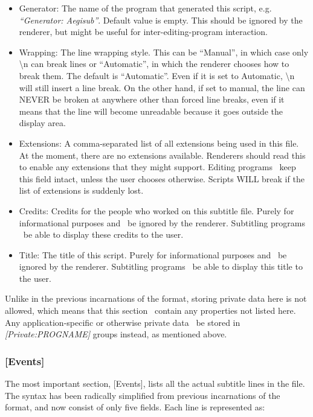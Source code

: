 \documentclass{spec}
\begin{document}
\begin{itemize}
\item Generator: The name of the program that generated this script, e.g. \textit{``Generator: Aegisub''}.
Default value is empty. This should be ignored by the renderer, but might be useful for inter-editing-program
interaction.
\item Wrapping: The line wrapping style. This can be ``Manual'', in which case only \textbackslash{n} can
break lines or ``Automatic'', in which the renderer chooses how to break them. The default is ``Automatic''.
Even if it is set to Automatic, \textbackslash{n} will still insert a line break.
On the other hand, if set to manual, the line can NEVER be broken at anywhere other than forced line breaks,
even if it means that the line will become unreadable because it goes outside the display area.
\item Extensions: A comma-separated list of all extensions being used in this file. At the moment, there are
no extensions available. Renderers should read this to enable any extensions that they might support.
Editing programs \must\ keep this field intact, unless the user chooses otherwise. Scripts WILL break
if the list of extensions is suddenly lost.
\item Credits: Credits for the people who worked on this subtitle file. Purely for informational purposes and
\should\ be ignored by the renderer. Subtitling programs \should\ be able to display these credits to the user.
\item Title: The title of this script. Purely for informational purposes and \should\ be ignored by the renderer.
Subtitling programs \should\ be able to display this title to the user.
\end{itemize}

Unlike in the previous incarnations of the format, storing private data here is not allowed, which means
that this section \mustnot\ contain any properties not listed here. Any application-specific or otherwise
private data \must\ be stored in \textit{[Private:PROGNAME]} groups instead, as mentioned above.


\subsubsection{[Events]}

The most important section, [Events], lists all the actual subtitle lines in the file. The syntax has
been radically simplified from previous incarnations of the format, and now consist of only five fields.
Each line is represented as:
\end{document}
